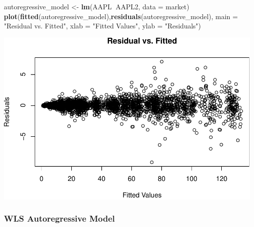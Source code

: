 \documentclass[]{article}
\newenvironment{Shaded}{\begin{snugshade}}{\end{snugshade}}
\newcommand{\KeywordTok}[1]{\textcolor[rgb]{0.13,0.29,0.53}{\textbf{#1}}}
\newcommand{\DataTypeTok}[1]{\textcolor[rgb]{0.13,0.29,0.53}{#1}}
\newcommand{\StringTok}[1]{\textcolor[rgb]{0.31,0.60,0.02}{#1}}
\newcommand{\OperatorTok}[1]{\textcolor[rgb]{0.81,0.36,0.00}{\textbf{#1}}}
\newcommand{\NormalTok}[1]{#1}
\begin{document}
\begin{Shaded}
\begin{Highlighting}[]
\NormalTok{autoregressive_model <-}\StringTok{ }\KeywordTok{lm}\NormalTok{(AAPL}\OperatorTok{~}\NormalTok{AAPL2, }\DataTypeTok{data =}\NormalTok{ market)}
\KeywordTok{plot}\NormalTok{(}\KeywordTok{fitted}\NormalTok{(autoregressive_model),}\KeywordTok{residuals}\NormalTok{(autoregressive_model), }
     \DataTypeTok{main =} \StringTok{"Residual vs. Fitted"}\NormalTok{, }\DataTypeTok{xlab =} \StringTok{"Fitted Values"}\NormalTok{, }\DataTypeTok{ylab =} \StringTok{"Residuals"}\NormalTok{)}
\end{Highlighting}
\end{Shaded}

\includegraphics{report_files/figure-latex/unnamed-chunk-7-1.pdf}

\subsubsection{WLS Autoregressive Model}\label{wls-autoregressive-model}
\end{document}
